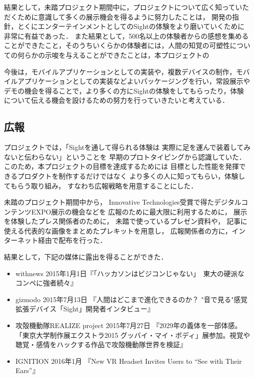 結果として，未踏プロジェクト期間中に，プロジェクトについて広く知っていただくために意識して多くの展示機会を得るように努力したことは，
開発の指針，とくにエンターテインメントとしてのSightの体験をより磨いていくために非常に有益であった．
また結果として，500名以上の体験者からの感想を集めることができたこと，そのうちいくらかの体験者には，人間の知覚の可塑性についての何らかの示唆を与えることができたことは，本プロジェクトの

今後は，モバイルアプリケーションとしての実装や，複数デバイスの制作，モバイルアプリケーションとしての実装などよいパッケージングを行い，常設展示やデモの機会を得ることで，より多くの方にSightの体験をしてもらったり，体験について伝える機会を設けるための努力を行っていきたいと考えている．


\subsection{広報}

プロジェクトでは，「Sightを通して得られる体験は
実際に足を運んで装着してみないと伝わらない」ということを
早期のプロトタイピングから認識していた．
このため，本プロジェクトの目標を達成するためには
目標とした性能を発揮できるプロダクトを制作するだけではなく
より多くの人に知ってもらい，体験してもらう取り組み，
すなわち広報戦略を用意することにした．

未踏のプロジェクト期間中から，
Innovative Technologies受賞で得たデジタルコンテンツEXPO展示の機会などを
広報のために最大限に利用するために，
展示を体験したプレス関係者のために，
未踏で使っているプレゼン資料や，
記事に使える代表的な画像をまとめたプレキットを用意し，
広報関係者の方に，インターネット経由で配布を行った．

結果として，下記の媒体に露出を得ることができた．

\begin{itemize}
 \item withnews 2015年1月1日『「ハッカソンはビジコンじゃない」　東大の硬派なコンペに強者続々』
 \item gizmodo 2015年7月13日 『人間はどこまで進化できるのか？ "音で見る"感覚拡張デバイス「Sight」開発者インタビュー』
 \item 攻殻機動隊REALIZE project 2015年7月27日 『2029年の義体を一部体感。「東京大学制作展エクストラ2015 グッバイ・マイ・ボディ」展参加。視覚や聴覚・感情をハックする作品で攻殻機動隊世界を検証』
 \item IGNITION 2016年1月 『New VR Headset Invites Users to “See with Their Ears”』
\end{itemize}

